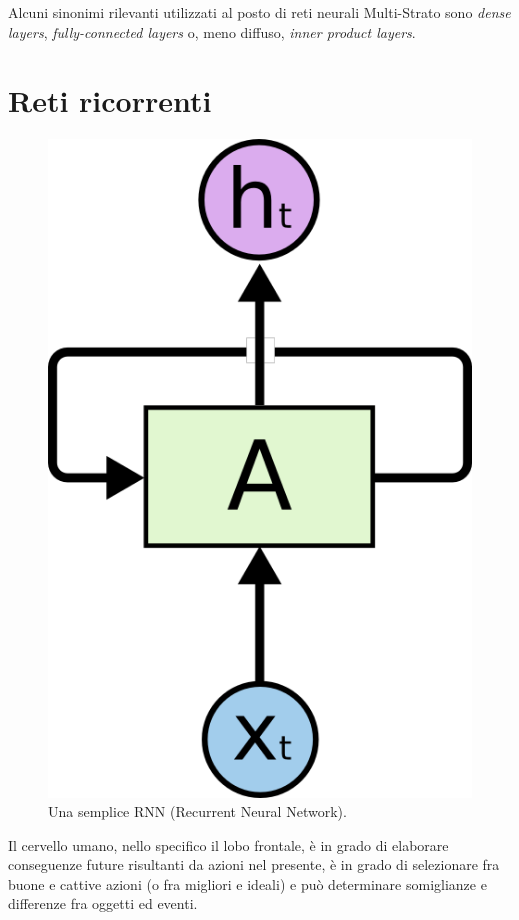 Alcuni sinonimi rilevanti utilizzati al posto di reti neurali Multi-Strato 
sono \textit{dense layers}, \textit{fully-connected layers} o, meno diffuso, \textit{inner product layers}.
\section{Reti ricorrenti}
\begin{figure}[ht]
	\centering
	\includegraphics{img/rnn.png}
	\caption{Una semplice RNN (Recurrent Neural Network).}
	\label{fig:1.4}
\end{figure}
Il cervello umano, nello specifico il lobo frontale, è in grado di elaborare conseguenze future risultanti da azioni nel presente, è in grado di selezionare fra buone e cattive azioni (o fra migliori e ideali) e può determinare somiglianze e differenze fra oggetti ed eventi.

